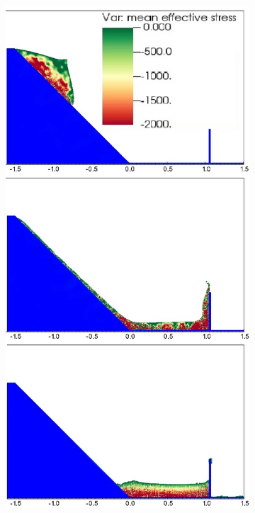 \documentclass[preprint,12pt]{elsarticle}
\begin{document}
\begin{figure}[H]
\center
\begin{subfigure}[c]{0.5\linewidth}
\includegraphics[width=\linewidth]{SHMPM.jpg}

\end{subfigure}
\end{figure}
\end{document}
